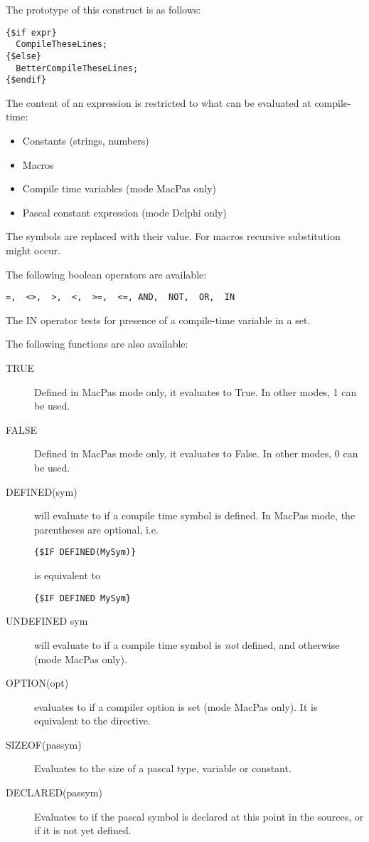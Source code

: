 The prototype of this construct is as follows:
\begin{verbatim}
{$if expr}
  CompileTheseLines;
{$else}
  BetterCompileTheseLines;
{$endif}
\end{verbatim}

The content of an expression is restricted to what can be evaluated at
compile-time:
\begin{itemize}
\item Constants (strings, numbers)
\item Macros
\item Compile time variables (mode MacPas only)
\item Pascal constant expression (mode Delphi only)
\end{itemize}
The symbols are replaced with their value. For macros recursive substitution
might occur.

The following boolean operators are available:
\begin{verbatim}
=,  <>,  >,  <,  >=,  <=, AND,  NOT,  OR,  IN 
\end{verbatim}
The IN operator tests for presence of a compile-time variable in a set.

The following functions are also available:
\begin{description}
\item[TRUE] Defined in MacPas mode only, it evaluates to True. In other
modes, 1 can be used.
\item[FALSE] Defined in MacPas mode only, it evaluates to False. In other
modes, 0 can be used.
\item[DEFINED(sym)] will evaluate to  if a compile time symbol is
defined. In MacPas mode, the parentheses are optional, i.e. 
\begin{verbatim}
{$IF DEFINED(MySym)}
\end{verbatim}
is equivalent to 
\begin{verbatim}
{$IF DEFINED MySym}
\end{verbatim}
\item[UNDEFINED sym] will evaluate to  if a compile time symbol is {\em
not} defined, and  otherwise (mode MacPas only).
\item[OPTION(opt)] evaluates to  if a compiler option is set (mode MacPas
only). It is equivalent to the  directive.
\item[SIZEOF(passym)] Evaluates to the size of a pascal type, variable or
constant.
\item[DECLARED(passym)] Evaluates to  if the pascal symbol is
declared at this point in the sources, or  if it is not yet
defined.
\end{description}

